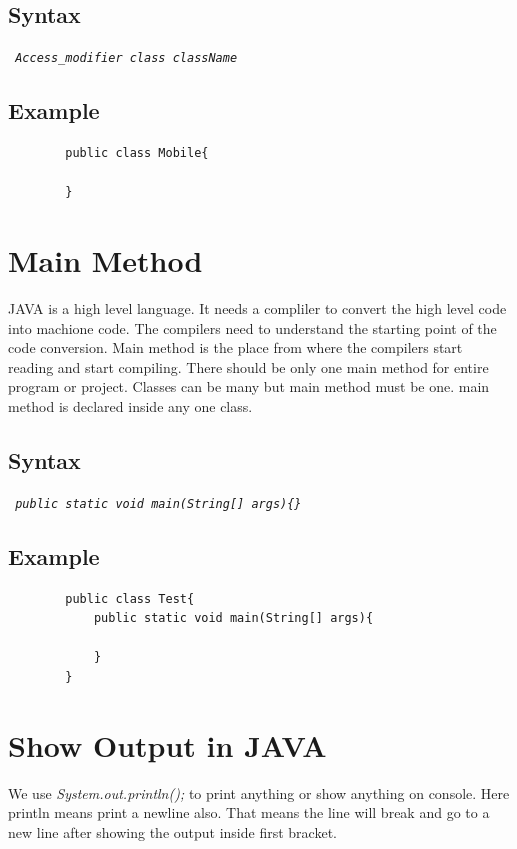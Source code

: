 \documentclass[A4 paper,openany]{book}  %
\begin{document}
\subsection{Syntax}
\begin{center}
    \tt{
        \textit{Access\_modifier class className}
    }
\end{center}
% 
% 
\subsection{Example}
\begin{center}
    \begin{verbatim}
        public class Mobile{

        }
    \end{verbatim}
\end{center}

% 
% 
\section{Main Method}
JAVA is a high level language. It needs a compliler to convert the high level code into machione code. The compilers need to understand the starting point of the code conversion.
Main method is the place from where the compilers start reading and start compiling. There should be only one main method for entire program or project. Classes can be many but main method
must be one. main method is declared inside any one class.
% 
% 
\subsection{Syntax}
\begin{center}
    \tt{
        \textit{public static void main(String[] args)\{\}}
    }
\end{center}
% 
% 
\subsection{Example}
\begin{center}
    \begin{verbatim}
        public class Test{
            public static void main(String[] args){

            }
        }
    \end{verbatim}
\end{center}

% 
% 
\section{Show Output in JAVA}
We use \textit{System.out.println();} to print anything or show anything on console. Here println means print a newline also.
That means the line will break and go to a new line after showing the output inside first bracket.
% 
% 
\end{document}
